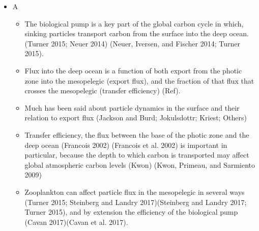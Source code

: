 \documentclass[]{article}
\providecommand{\tightlist}{%
  \setlength{\itemsep}{0pt}\setlength{\parskip}{0pt}}
\begin{document}
\begin{itemize}
\tightlist
\item
  A

  \begin{itemize}
  \tightlist
  \item
    The biological pump is a key part of the global carbon cycle in
    which, sinking particles transport carbon from the surface into the
    deep ocean. (Turner 2015; Neuer 2014) (Neuer, Iversen, and Fischer
    2014; Turner 2015).
  \item
    Flux into the deep ocean is a function of both export from the
    photic zone into the mesopelegic (export flux), and the fraction of
    that flux that crosses the mesopelegic (transfer efficiency) (Ref).
  \item
    Much has been said about particle dynamics in the surface and their
    relation to export flux (Jackson and Burd; Jokulsdottr; Kriest;
    Others)
  \item
    Transfer efficiency, the flux between the base of the photic zone
    and the deep ocean (Francois 2002) (Francois et al. 2002) is
    important in particular, because the depth to which carbon is
    transported may affect global atmospheric carbon levels (Kwon)
    (Kwon, Primeau, and Sarmiento 2009)
  \item
    Zooplankton can affect particle flux in the mesopelegic in several
    ways (Turner 2015; Steinberg and Landry 2017)(Steinberg and Landry
    2017; Turner 2015), and by extension the efficiency of the
    biological pump (Cavan 2017)(Cavan et al. 2017).


\end{itemize}
\end{itemize}
\end{document}
